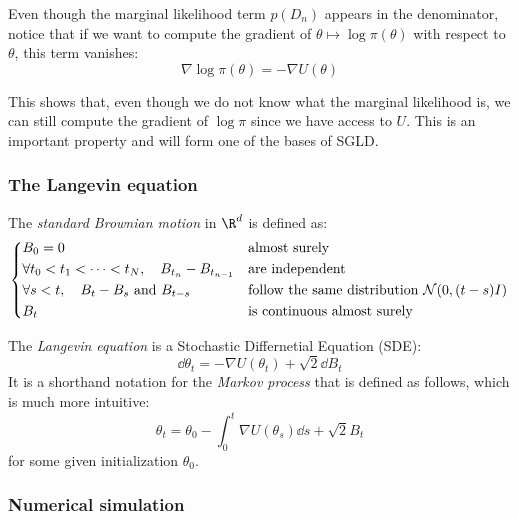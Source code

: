 \documentclass[toc, titlepaged]{../cs-classes/cs-classes}
\begin{document}
Even though the marginal likelihood term $p(D_n)$ appears in the denominator, notice that if we want to compute the gradient of $\theta\longmapsto\log\pi(\theta)$ with respect to $\theta$, this term vanishes:
\begin{equation*}
    \nabla\log\pi(\theta)=-\nabla U(\theta)
\end{equation*}

This shows that, even though we do not know what the marginal likelihood is, we can still compute the gradient of $\log\pi$ since we have access to $U$. This is an important property and will form one of the bases of SGLD.

\subsubsection{The Langevin equation}
\begin{definition}
    The \emph{standard Brownian motion} in $\R^d$ is defined as:
    \begin{equation}
        \begin{cases*}
            B_0=0 & almost surely\\
            \forall t_0<t_1<\dots<t_N,\quad B_{t_n}-B_{t_{n-1}} & are independent\\
            \forall s<t, \quad B_t-B_s \textnormal{ and } B_{t-s} & follow the same distribution $\mathcal{N}(0, (t-s)I)$\\
            B_t & is continuous almost surely
        \end{cases*}
    \end{equation}
\end{definition}

\begin{definition}
    The \emph{Langevin equation} is a Stochastic Differnetial Equation (SDE):
    \begin{equation}
        \dd\theta_t = -\nabla U(\theta_t)+\sqrt{2}\dd B_t
    \end{equation}
    It is a shorthand notation for the \emph{Markov process} that is defined as follows, which is much more intuitive:
    \begin{equation}
        \theta_t = \theta_0 - \int_0^t\nabla U(\theta_s)\dd s+\sqrt{2}B_t
    \end{equation}
    for some given initialization $\theta_0$.
\end{definition}

\subsubsection{Numerical simulation}
\end{document}

